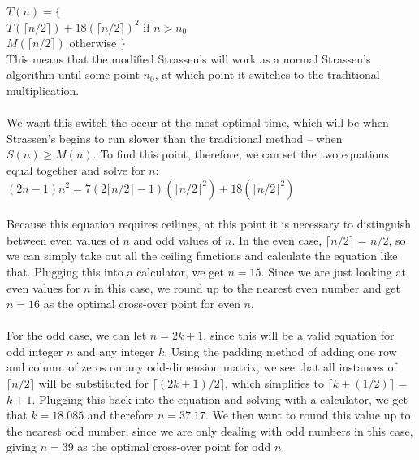 \documentclass[11pt]{article}
\begin{document}
$T(n) = \{$ \\
$T(\lceil n/2 \rceil) + 18(\lceil n/2 \rceil)^2$ if $n > n_0$ \\
$M(\lceil n/2 \rceil)$ otherwise $\}$ \\
This means that the modified Strassen's will work as a normal Strassen's algorithm until some point $n_0$, at which point it switches to the traditional multiplication. \\\\
We want this switch the occur at the most optimal time, which will be when Strassen's begins to run slower than the traditional method -- when $S(n) \geq M(n)$. To find this point, therefore, we can set the two equations equal together and solve for $n$: \\
$(2n - 1)n^2 = 7(2\lceil n/2 \rceil - 1)(\lceil n/2\rceil^2) + 18(\lceil n/2\rceil^2)$ \\\\
Because this equation requires ceilings, at this point it is necessary to distinguish between even values of $n$ and odd values of $n$. In the even case, $\lceil n/2 \rceil$ = $n/2$, so we can simply take out all the ceiling functions and calculate the equation like that. Plugging this into a calculator, we get $n = 15$. Since we are just looking at even values for $n$ in this case, we round up to the nearest even number and get $n = 16$ as the optimal cross-over point for even $n$. \\\\
For the odd case, we can let $n = 2k + 1$, since this will be a valid equation for odd integer $n$ and any integer $k$. Using the padding method of adding one row and column of zeros on any odd-dimension matrix, we see that all instances of $\lceil n/2 \rceil$ will be substituted for $\lceil (2k + 1)/2 \rceil$, which simplifies to $\lceil k + (1/2) \rceil$ = $k + 1$. Plugging this back into the equation and solving with a calculator, we get that $k = 18.085$ and therefore $n = 37.17$. We then want to round this value up to the nearest odd number, since we are only dealing with odd numbers in this case, giving $n = 39$ as the optimal cross-over point for odd $n$. \\\\
\end{document}
